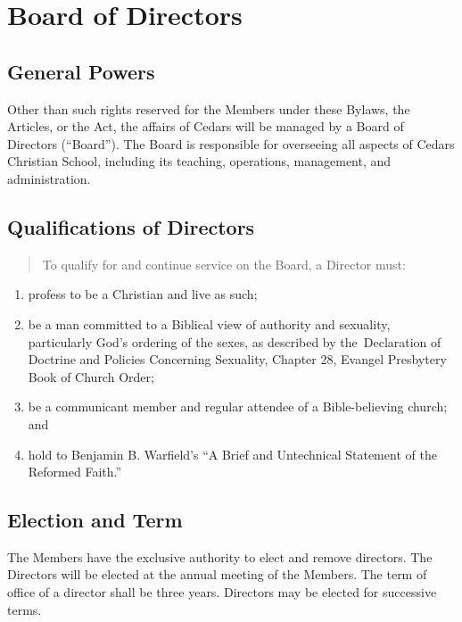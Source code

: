 \documentclass[
]{book}
\begin{document}
\chapter{Board of Directors}\label{board-of-directors}

\section{General Powers}\label{general-powers}

Other than such rights reserved for the Members under these Bylaws,
the Articles, or the Act, the affairs of Cedars will be managed by a
Board of Directors (``Board''). The Board is responsible for overseeing
all aspects of Cedars Christian School, including its teaching,
operations, management, and administration.

\section{Qualifications of Directors}\label{qualifications-of-directors}

\begin{quote}
To qualify for and continue service on the Board, a Director must:
\end{quote}

\begin{enumerate}
\def\labelenumi{\alph{enumi})}
\item
  profess to be a Christian and live as such;
\item
  be a man committed to a Biblical view of authority and sexuality,
  particularly God's ordering of the sexes, as described by
  the~Declaration of Doctrine and Policies Concerning Sexuality,
  Chapter 28, Evangel Presbytery Book of Church Order;
\item
  be a communicant member and regular attendee of a Bible-believing
  church; and
\item
  hold to Benjamin B. Warfield's ``A Brief and Untechnical Statement of
  the Reformed Faith.''
\end{enumerate}

\section{Election and Term}\label{election-and-term}

The Members have the exclusive authority to elect and remove
directors. The Directors will be elected at the annual meeting of the
Members. The term of office of a director shall be three years.
Directors may be elected for successive terms.
\end{document}

